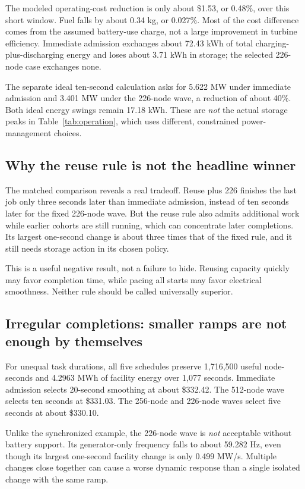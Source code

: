 \documentclass[11pt]{article}
\begin{document}
The modeled operating-cost reduction is only about \$1.53, or
0.48\%, over this short window. Fuel falls by about 0.34 kg, or
0.027\%. Most of the cost difference comes from the assumed battery-use
charge, not a large improvement in turbine efficiency. Immediate
admission exchanges about 72.43 kWh of total charging-plus-discharging
energy and loses about 3.71 kWh in storage; the selected 226-node
case exchanges none.

The separate ideal ten-second calculation asks for 5.622 MW under
immediate admission and 3.401 MW under the 226-node wave, a reduction
of about 40\%. Both ideal energy swings remain 17.18 kWh.
These are \emph{not} the actual storage peaks in
Table~\ref{tab:operation}, which uses different, constrained
power-management choices.

\subsection{Why the reuse rule is not the headline winner}

The matched comparison reveals a real tradeoff. Reuse plus 226 finishes
the last job only three seconds later than immediate admission,
instead of ten seconds later for the fixed 226-node wave.
But the reuse rule also admits additional work while earlier cohorts
are still running, which can concentrate later completions.
Its largest one-second change is about three times that of the
fixed rule, and it still needs storage action in its chosen policy.

This is a useful negative result, not a failure to hide.
Reusing capacity quickly may favor completion time, while pacing all
starts may favor electrical smoothness. Neither rule should be called
universally superior.

\subsection{Irregular completions: smaller ramps are not enough by themselves}

For unequal task durations, all five schedules preserve 1,716,500 useful
node-seconds and 4.2963 MWh of facility energy over 1,077 seconds.
Immediate admission selects 20-second smoothing at about \$332.42.
The 512-node wave selects ten seconds at \$331.03. The 256-node
and 226-node waves select five seconds at about \$330.10.

Unlike the synchronized example, the 226-node wave is \emph{not}
acceptable without battery support. Its generator-only frequency falls
to about 59.282 Hz, even though its largest one-second facility change
is only 0.499 MW/s. Multiple changes close together can cause a worse
dynamic response than a single isolated change with the same ramp.
\end{document}
